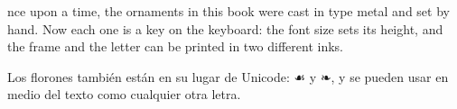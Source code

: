 \documentclass{article}
\begin{document}
\begin{center}
\end{center}

\cenefa[angosta]

\medskip
{}%
\noindent{}\hspace{4pt}%
\parbox[b]{\dimexpr\linewidth-\wd0-4pt}{%
  nce upon a time, the ornaments in this book were cast in type metal
  and set by hand. Now each one is a key on the keyboard: the font size
  sets its height, and the frame and the letter can be printed in two
  different inks.}

\separador

Los florones también están en su lugar de Unicode:
{\flores ☙} y {\flores ❧}, y se pueden usar en medio del texto
 como cualquier otra letra.

\cenefa

\vfill
\begin{center}
  \quad{}\quad\retrato[80pt]
\end{center}
\end{document}
